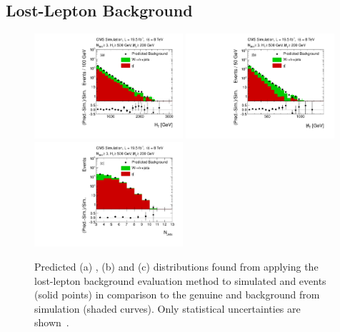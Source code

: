 \subsection{Lost-Lepton Background}
\label{subsec:RA2_lostlepton}
\begin{figure}[!t]
  \centering

  \begin{minipage}[c]{1.\textwidth}
    \begin{center}
      \includegraphics[width=0.49\textwidth]{figures/RA2_LL1.pdf}%
      \includegraphics[width=0.49\textwidth]{figures/RA2_LL2.pdf}\\ 
      \includegraphics[width=0.49\textwidth]{figures/RA2_LL3.pdf}
    \end{center}
  \end{minipage}

  \caption{Predicted (a) \HT, (b) \MHT and (c) \NJets distributions found from applying the lost-lepton background evaluation method to simulated \ttbar and \WJets events (solid points) in comparison to the genuine \ttbar and \WJets background from simulation (shaded curves). Only statistical uncertainties are shown~\cite{Chatrchyan:2014lfa}.}
  \label{fig:ra2_ll}
\end{figure}
